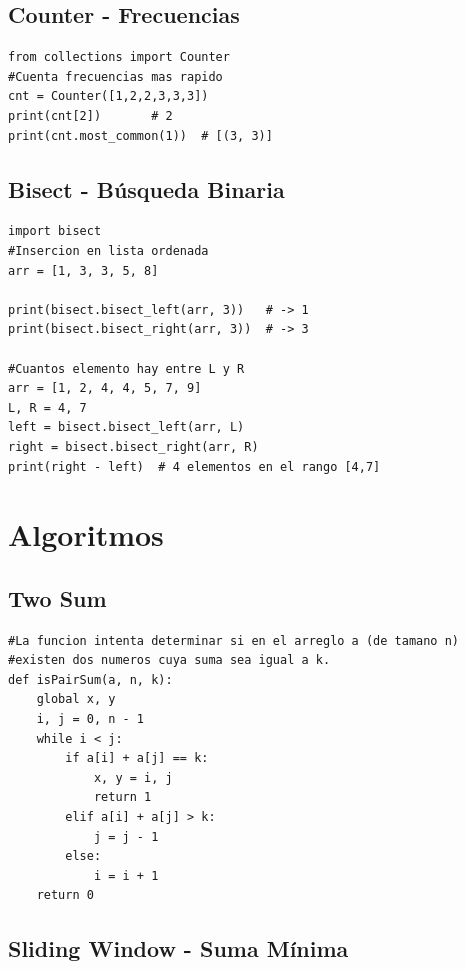 \documentclass{article}
\begin{document}
\subsection{Counter - Frecuencias}

\begin{lstlisting}[style=pythonstyle]
from collections import Counter
#Cuenta frecuencias mas rapido
cnt = Counter([1,2,2,3,3,3])
print(cnt[2])       # 2
print(cnt.most_common(1))  # [(3, 3)]
\end{lstlisting}

\subsection{Bisect - Búsqueda Binaria}

\begin{lstlisting}[style=pythonstyle]
import bisect
#Insercion en lista ordenada
arr = [1, 3, 3, 5, 8]

print(bisect.bisect_left(arr, 3))   # -> 1
print(bisect.bisect_right(arr, 3))  # -> 3

#Cuantos elemento hay entre L y R
arr = [1, 2, 4, 4, 5, 7, 9]
L, R = 4, 7
left = bisect.bisect_left(arr, L)
right = bisect.bisect_right(arr, R)
print(right - left)  # 4 elementos en el rango [4,7]
\end{lstlisting}


\section{Algoritmos}

\subsection{Two Sum}

\begin{lstlisting}[style=pythonstyle]
#La funcion intenta determinar si en el arreglo a (de tamano n) 
#existen dos numeros cuya suma sea igual a k.
def isPairSum(a, n, k):
	global x, y
	i, j = 0, n - 1
	while i < j:
		if a[i] + a[j] == k:
			x, y = i, j
			return 1
		elif a[i] + a[j] > k:
			j = j - 1
		else:
			i = i + 1
	return 0
\end{lstlisting}

\subsection{Sliding Window - Suma Mínima}
\end{document}
